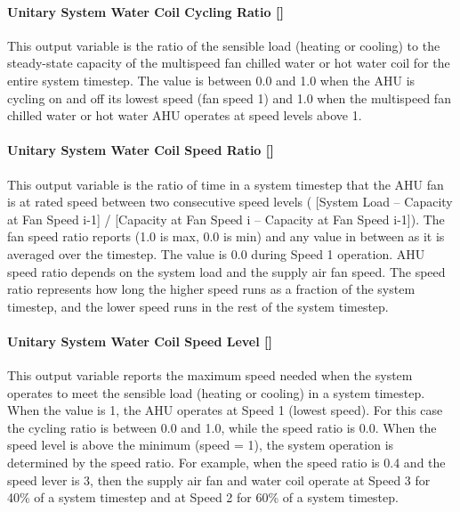 \paragraph{\texorpdfstring{Unitary System Water Coil Cycling Ratio {[]}}{Unitary System Water Coil Cycling Ratio }}\label{unitary-system-water-coil-cycling-ratio}

This output variable is the ratio of the sensible load (heating or cooling) to the steady-state capacity of the multispeed fan chilled water or hot water coil for the entire system timestep. The value is between 0.0 and 1.0 when the AHU is cycling on and off its lowest speed (fan speed 1) and 1.0 when the multispeed fan chilled water or hot water AHU operates at speed levels above 1.

\paragraph{\texorpdfstring{Unitary System Water Coil Speed Ratio {[]}}{Unitary System Water Coil Speed Ratio }}\label{unitary-system-water-coil-speed-ratio}

This output variable is the ratio of time in a system timestep that the AHU fan is at rated speed between two consecutive speed levels ( {[}System Load -- Capacity at Fan Speed i-1{]} / {[}Capacity at Fan Speed i -- Capacity at Fan Speed i-1{]}). The fan speed ratio reports (1.0 is max, 0.0 is min) and any value in between as it is averaged over the timestep. The value is 0.0 during Speed 1 operation. AHU speed ratio depends on the system load and the supply air fan speed. The speed ratio represents how long the higher speed runs as a fraction of the system timestep, and the lower speed runs in the rest of the system timestep.

\paragraph{\texorpdfstring{Unitary System Water Coil Speed Level {[]}}{Unitary System Water Coil Speed Level }}\label{unitary-system-water-coil-speed-level}

This output variable reports the maximum speed needed when the system operates to meet the sensible load (heating or cooling) in a system timestep. When the value is 1, the AHU operates at Speed 1 (lowest speed). For this case the cycling ratio is between 0.0 and 1.0, while the speed ratio is 0.0. When the speed level is above the minimum (speed = 1), the system operation is determined by the speed ratio. For example, when the speed ratio is 0.4 and the speed lever is 3, then the supply air fan and water coil operate at Speed 3 for 40\% of a system timestep and at Speed 2 for 60\% of a system timestep.

